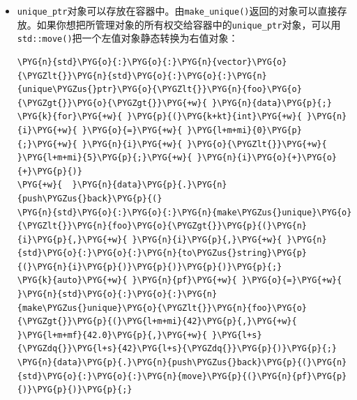 \begin{itemize}

\begin{codeblockbg}
\begin{Verbatim}[commandchars=\\\{\},breaklines=true,breakanywhere=true,fontsize=\codefont,xleftmargin=17bp]
\PYG{n}{std}\PYG{o}{:}\PYG{o}{:}\PYG{n}{unique\PYGZus{}ptr}\PYG{o}{\PYGZlt{}}\PYG{k+kt}{int}\PYG{o}{\PYGZgt{}}\PYG{+w}{ }\PYG{n}{pi}\PYG{p}{(}\PYG{k}{new}\PYG{+w}{ }\PYG{k+kt}{int}\PYG{p}{(}\PYG{l+m+mi}{42}\PYG{p}{)}\PYG{p}{)}\PYG{p}{;}
\PYG{k}{if}\PYG{+w}{ }\PYG{p}{(}\PYG{n}{pi}\PYG{p}{)}\PYG{+w}{ }\PYG{n}{std}\PYG{o}{:}\PYG{o}{:}\PYG{n}{cout}\PYG{+w}{ }\PYG{o}{\PYGZlt{}}\PYG{o}{\PYGZlt{}}\PYG{+w}{ }\PYG{l+s}{\PYGZdq{}}\PYG{l+s}{not null}\PYG{l+s}{\PYGZdq{}}\PYG{+w}{ }\PYG{o}{\PYGZlt{}}\PYG{o}{\PYGZlt{}}\PYG{+w}{ }\PYG{n}{std}\PYG{o}{:}\PYG{o}{:}\PYG{n}{endl}\PYG{p}{;}
\end{Verbatim}
\end{codeblockbg}



\item \texttt{unique\_\allowbreak{}ptr}对象可以存放在容器中。由\texttt{make\_\allowbreak{}unique()}返回的对象可以直接存放。如果你想把所管理对象的所有权交给容器中的\texttt{unique\_\allowbreak{}ptr}对象，可以用\texttt{std::\allowbreak{}move()}把一个左值对象静态转换为右值对象：



\begin{codeblockbg}
\begin{Verbatim}[commandchars=\\\{\},breaklines=true,breakanywhere=true,fontsize=\codefont,xleftmargin=17bp]
\PYG{n}{std}\PYG{o}{:}\PYG{o}{:}\PYG{n}{vector}\PYG{o}{\PYGZlt{}}\PYG{n}{std}\PYG{o}{:}\PYG{o}{:}\PYG{n}{unique\PYGZus{}ptr}\PYG{o}{\PYGZlt{}}\PYG{n}{foo}\PYG{o}{\PYGZgt{}}\PYG{o}{\PYGZgt{}}\PYG{+w}{ }\PYG{n}{data}\PYG{p}{;}
\PYG{k}{for}\PYG{+w}{ }\PYG{p}{(}\PYG{k+kt}{int}\PYG{+w}{ }\PYG{n}{i}\PYG{+w}{ }\PYG{o}{=}\PYG{+w}{ }\PYG{l+m+mi}{0}\PYG{p}{;}\PYG{+w}{ }\PYG{n}{i}\PYG{+w}{ }\PYG{o}{\PYGZlt{}}\PYG{+w}{ }\PYG{l+m+mi}{5}\PYG{p}{;}\PYG{+w}{ }\PYG{n}{i}\PYG{o}{+}\PYG{o}{+}\PYG{p}{)}
\PYG{+w}{  }\PYG{n}{data}\PYG{p}{.}\PYG{n}{push\PYGZus{}back}\PYG{p}{(}
\PYG{n}{std}\PYG{o}{:}\PYG{o}{:}\PYG{n}{make\PYGZus{}unique}\PYG{o}{\PYGZlt{}}\PYG{n}{foo}\PYG{o}{\PYGZgt{}}\PYG{p}{(}\PYG{n}{i}\PYG{p}{,}\PYG{+w}{ }\PYG{n}{i}\PYG{p}{,}\PYG{+w}{ }\PYG{n}{std}\PYG{o}{:}\PYG{o}{:}\PYG{n}{to\PYGZus{}string}\PYG{p}{(}\PYG{n}{i}\PYG{p}{)}\PYG{p}{)}\PYG{p}{)}\PYG{p}{;}
\PYG{k}{auto}\PYG{+w}{ }\PYG{n}{pf}\PYG{+w}{ }\PYG{o}{=}\PYG{+w}{ }\PYG{n}{std}\PYG{o}{:}\PYG{o}{:}\PYG{n}{make\PYGZus{}unique}\PYG{o}{\PYGZlt{}}\PYG{n}{foo}\PYG{o}{\PYGZgt{}}\PYG{p}{(}\PYG{l+m+mi}{42}\PYG{p}{,}\PYG{+w}{ }\PYG{l+m+mf}{42.0}\PYG{p}{,}\PYG{+w}{ }\PYG{l+s}{\PYGZdq{}}\PYG{l+s}{42}\PYG{l+s}{\PYGZdq{}}\PYG{p}{)}\PYG{p}{;}
\PYG{n}{data}\PYG{p}{.}\PYG{n}{push\PYGZus{}back}\PYG{p}{(}\PYG{n}{std}\PYG{o}{:}\PYG{o}{:}\PYG{n}{move}\PYG{p}{(}\PYG{n}{pf}\PYG{p}{)}\PYG{p}{)}\PYG{p}{;}
\end{Verbatim}
\end{codeblockbg}

\end{itemize}


